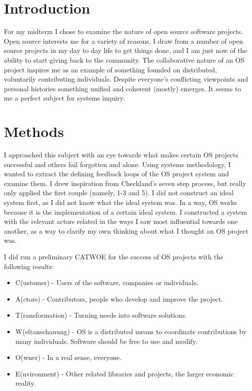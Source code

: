 \documentclass[10pt]{article}
\begin{document}
\maketitle

\section{Introduction}

For my midterm I chose to examine the nature of open source software projects.  Open source interests me for a variety of reasons.  I draw from a number of open source projects in my day to day life to get things done, and I am just now of the ability to start giving back to the community.  The collaborative nature of an OS project inspires me as an example of something founded on distributed, voluntarily contributing individuals.  Despite everyone's conflicting viewpoints and personal histories something unified and coherent (mostly) emerges.  It seems to me a perfect subject for systems inquiry.

\section{Methods}

I approached this subject with an eye towards what makes certain OS projects successful and others fail forgotten and alone.  Using systems methodology, I wanted to extract the defining feedback loops of the OS project system and examine them.  I drew inspiration from Checkland's seven step process, but really only applied the first couple (namely, 1-3 and 5).  I did not construct an ideal system first, as I did not know what the ideal system was.  In a way, OS works because it is the implementation of a certain ideal system.  I constructed a system with the relevant actors related in the ways I saw most influential towards one another, as a way to clarify my own thinking about what I thought an OS project was.  

I did run a preliminary CATWOE for the success of OS projects with the following results:

\begin{itemize}
\item C(ustomer) - Users of the software, companies or individuals.
\item A(ctors) - Contributors, people who develop and improve the project.
\item T(ransformation) - Turning needs into software solutions.
\item W(eltanschauung) - OS is a distributed means to coordinate contributions by many individuals.  Software should be free to use and modify.
\item O(wner) - In a real sense, everyone.
\item E(nvironment) - Other related libraries and projects, the larger economic reality.
\end{itemize}
\end{document}
